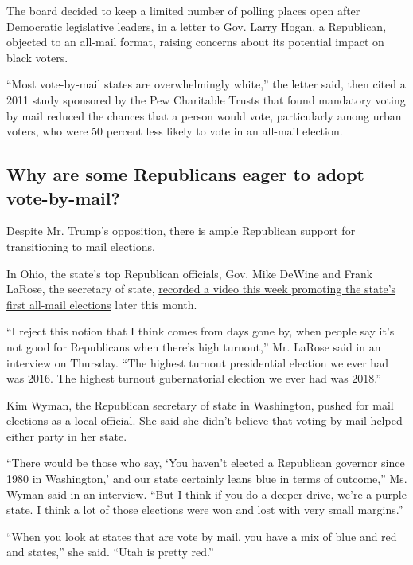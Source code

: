 The board decided to keep a limited number of polling places open after
Democratic legislative leaders, in a letter to Gov. Larry Hogan, a
Republican, objected to an all-mail format, raising concerns about its
potential impact on black voters.

``Most vote-by-mail states are overwhelmingly white,'' the letter said,
then cited a 2011 study sponsored by the Pew Charitable Trusts that
found mandatory voting by mail reduced the chances that a person would
vote, particularly among urban voters, who were 50 percent less likely
to vote in an all-mail election.

\hypertarget{why-are-some-republicans-eager-to-adopt-vote-by-mail}{%
\subsection{Why are some Republicans eager to adopt
vote-by-mail?}\label{why-are-some-republicans-eager-to-adopt-vote-by-mail}}

Despite Mr. Trump's opposition, there is ample Republican support for
transitioning to mail elections.

In Ohio, the state's top Republican officials, Gov. Mike DeWine and
Frank LaRose, the secretary of state,
\href{https://www.youtube.com/watch?v=gYliBlyROxo\&feature=youtu.be}{recorded
a video this week promoting the state's first all-mail elections} later
this month.

``I reject this notion that I think comes from days gone by, when people
say it's not good for Republicans when there's high turnout,'' Mr.
LaRose said in an interview on Thursday. ``The highest turnout
presidential election we ever had was 2016. The highest turnout
gubernatorial election we ever had was 2018.''

Kim Wyman, the Republican secretary of state in Washington, pushed for
mail elections as a local official. She said she didn't believe that
voting by mail helped either party in her state.

``There would be those who say, `You haven't elected a Republican
governor since 1980 in Washington,' and our state certainly leans blue
in terms of outcome,'' Ms. Wyman said in an interview. ``But I think if
you do a deeper drive, we're a purple state. I think a lot of those
elections were won and lost with very small margins.''

``When you look at states that are vote by mail, you have a mix of blue
and red and states,'' she said. ``Utah is pretty red.''

